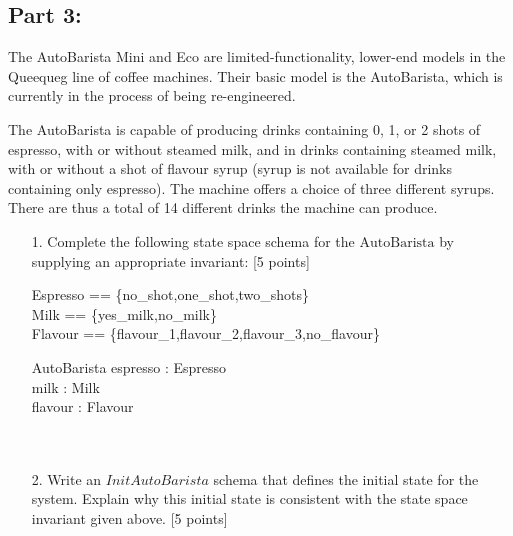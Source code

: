 \documentclass[12pt,fleqn]{article}
\begin{document}
\begin{enumerate}
\section*{\sc Part 3:}

The AutoBarista Mini and Eco are limited-functionality, lower-end models in the Queequeg line of coffee machines. Their basic model is the AutoBarista, which is currently in the process of being re-engineered.

The AutoBarista is capable of producing drinks containing 0, 1, or 2 shots of espresso, with or without steamed milk, and in drinks containing steamed milk, with or without a shot of flavour syrup (syrup is not available for drinks containing only espresso). The machine offers a choice of three different syrups. There are thus a total of 14 different drinks the machine can produce.

\begin{enumerate}
\item[1.] Complete the following state space schema for the $\mathrm{AutoBarista}$ by supplying an appropriate invariant: [5 points]

\begin{zed}
Espresso == \{no\_shot,one\_shot,two\_shots\}\\
Milk == \{yes\_milk,no\_milk\}\\
Flavour == \{flavour\_1,flavour\_2,flavour\_3,no\_flavour\}
\end{zed}

\begin{schema}{AutoBarista}
espresso : Espresso\\
milk : Milk\\
flavour : Flavour
\where
~\\ %
~\\ %
~   %
\end{schema}

\item[2.] Write an $InitAutoBarista$ schema that defines the initial state for the system. Explain why this initial state is consistent with the state space invariant given above. [5 points]




\end{enumerate}
\end{enumerate}
\end{document}
